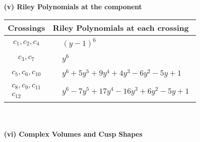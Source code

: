 \documentclass[1p]{elsarticle_modified}
\theoremstyle{definition}
\begin{document}
\newpage\renewcommand{\arraystretch}{1}
\flushleft \textbf{(v) Riley Polynomials at the component}\newline \\
\begin{tabular}{m{50pt}|m{274pt}}
Crossings & \hspace{64pt}Riley Polynomials at each crossing \\
\hline $$\begin{aligned}c_{1},c_{2},c_{4}\end{aligned}$$&$\begin{aligned}
&(y-1)^6
\end{aligned}$\\
\hline $$\begin{aligned}c_{3},c_{7}\end{aligned}$$&$\begin{aligned}
&y^6
\end{aligned}$\\
\hline $$\begin{aligned}c_{5},c_{6},c_{10}\end{aligned}$$&$\begin{aligned}
&y^6+5 y^5+9 y^4+4 y^3-6 y^2-5 y+1
\end{aligned}$\\
\hline $$\begin{aligned}c_{8},c_{9},c_{11}\\c_{12}\end{aligned}$$&$\begin{aligned}
&y^6-7 y^5+17 y^4-16 y^3+6 y^2-5 y+1
\end{aligned}$\\
\hline
\end{tabular}\\~\\
\newpage\flushleft \textbf{(vi) Complex Volumes and Cusp Shapes}
\end{document}
